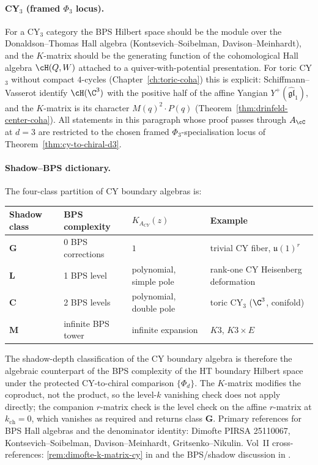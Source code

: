 \begin{remark}
\paragraph{CY\texorpdfstring{$_3$}{-3} (framed \texorpdfstring{$\Phi_3$}{Phi-3} locus).} For a CY$_3$ category the
BPS Hilbert space should be the module over the Donaldson--Thomas Hall
algebra (Kontsevich--Soibelman, Davison--Meinhardt), and the $K$-matrix
should be the generating function of the cohomological Hall algebra
$\cH(Q, W)$ attached to a quiver-with-potential presentation. For toric
CY$_3$ without compact $4$-cycles (Chapter~\ref{ch:toric-coha}) this is
explicit: Schiffmann--Vasserot identify $\cH(\C^3)$ with the positive
half of the affine Yangian $Y^{+}(\widehat{\mathfrak{gl}}_1)$, and the
$K$-matrix is its character $M(q)^2 \cdot P(q)$
(Theorem~\ref{thm:drinfeld-center-coha}). All statements in this paragraph
whose proof passes through $A_\cC$ at $d = 3$ are restricted to the
chosen framed $\Phi_3$-specialisation locus of
Theorem~\ref{thm:cy-to-chiral-d3}.

\paragraph{Shadow--BPS dictionary.} The four-class partition of CY
boundary algebras is:
\begin{center}
\renewcommand{\arraystretch}{1.2}
\begin{tabular}{llll}
\toprule
Shadow class & BPS complexity & $K_{A_{CY}}(z)$ & Example \\
\midrule
$\mathbf{G}$ & 0 BPS corrections & $1$ & trivial CY fiber, $\mathfrak{u}(1)^r$ \\
$\mathbf{L}$ & 1 BPS level & polynomial, simple pole & rank-one CY Heisenberg deformation \\
$\mathbf{C}$ & 2 BPS levels & polynomial, double pole & toric CY$_3$ ($\C^3$, conifold) \\
$\mathbf{M}$ & infinite BPS tower & infinite expansion & $K3$, $K3 \times E$ \\
\bottomrule
\end{tabular}
\end{center}

The shadow-depth classification of the CY boundary algebra is therefore
the algebraic counterpart of the BPS complexity of the HT boundary
Hilbert space under the protected CY-to-chiral comparison
$\{\Phi_d\}$. The $K$-matrix modifies the coproduct, not the
product, so the level-$k$ vanishing check does not apply directly;
the companion $r$-matrix check is the level check on the affine
$r$-matrix at $k_{\mathrm{ch}} = 0$, which vanishes as required and
returns class $\mathbf{G}$. Primary references for BPS Hall algebras and
the denominator identity: Dimofte PIRSA 25110067, Kontsevich--Soibelman,
Davison--Meinhardt, Gritsenko--Nikulin. Vol~II cross-references:
\ref{rem:dimofte-k-matrix-cy} in
\cite{VolII} and the BPS/shadow
discussion in \cite{VolII}.
\end{remark}

